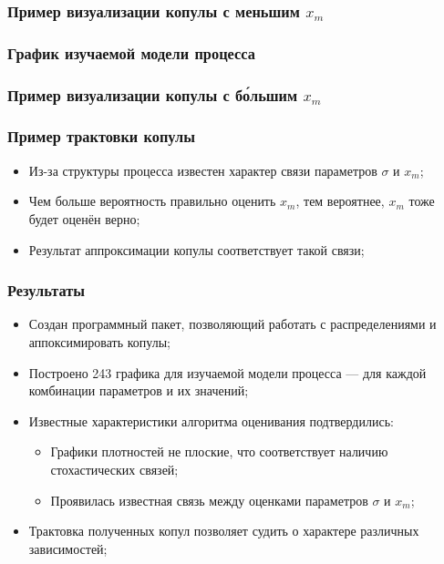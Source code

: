 \documentclass[11pt]{beamer}
\begin{document}
\begin{frame}
\begin{center}
\frametitle{Пример визуализации копулы с меньшим $x_m$}
\resizebox{\columnwidth}{!}{}
\end{center}
\end{frame}

\begin{frame}
\begin{center}
\frametitle{График изучаемой модели процесса}

\end{center}
\end{frame}

\begin{frame}
\begin{center}
\frametitle{Пример визуализации копулы с б\'{о}льшим $x_m$}
\resizebox{\columnwidth}{!}{}
\end{center}
\end{frame}

\begin{frame}
\begin{center}
\frametitle{Пример трактовки копулы}
\begin{itemize}
  \item Из-за структуры процесса известен характер связи параметров $\sigma$ и $x_m$;
  \item Чем больше вероятность правильно оценить $x_m$, тем вероятнее, $x_m$ тоже будет оценён верно;
  \item Результат аппроксимации копулы соответствует такой связи;
\end{itemize}
\end{center}
\end{frame}

\begin{frame}
\begin{center}
\frametitle{Результаты}
\begin{itemize}
  \item Создан программный пакет, позволяющий работать с распределениями и аппоксимировать копулы;
  \item Построено 243 графика для изучаемой модели процесса --- для каждой комбинации параметров и их значений;
  \item Известные характеристики алгоритма оценивания подтвердились:
  \begin{itemize}
    \item Графики плотностей не плоские, что соответствует наличию стохастических связей;
    \item Проявилась известная связь между оценками параметров $\sigma$ и $x_m$;
  \end{itemize}
  \item Трактовка полученных копул позволяет судить о характере различных зависимостей;
\end{itemize}
\end{center}
\end{frame}
\end{document}
